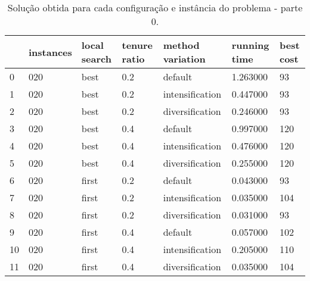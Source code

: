\begin{landscape}

\begin{table}
\centering
\begin{tabular}{lllllll}
\toprule
{} & instances & local search & tenure ratio & method variation & running time & best cost \\
\midrule
0  &       020 &         best &          0.2 &          default &     1.263000 &        93 \\
1  &       020 &         best &          0.2 &  intensification &     0.447000 &        93 \\
2  &       020 &         best &          0.2 &  diversification &     0.246000 &        93 \\
3  &       020 &         best &          0.4 &          default &     0.997000 &       120 \\
4  &       020 &         best &          0.4 &  intensification &     0.476000 &       120 \\
5  &       020 &         best &          0.4 &  diversification &     0.255000 &       120 \\
6  &       020 &        first &          0.2 &          default &     0.043000 &        93 \\
7  &       020 &        first &          0.2 &  intensification &     0.035000 &       104 \\
8  &       020 &        first &          0.2 &  diversification &     0.031000 &        93 \\
9  &       020 &        first &          0.4 &          default &     0.057000 &       102 \\
10 &       020 &        first &          0.4 &  intensification &     0.205000 &       110 \\
11 &       020 &        first &          0.4 &  diversification &     0.035000 &       104 \\
\bottomrule
\end{tabular}
\caption{Solução obtida para cada configuração e instância do problema - parte 0.}
\label{table:all-data-0}
\end{table}


\end{landscape}
